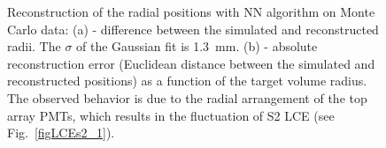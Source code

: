 \begin{figure}[!t]
\centering
{}
\caption[Reconstruction of the radial positions with the neural network algorithm on Monte Carlo data]{Reconstruction of the radial positions with NN algorithm on Monte Carlo data: (a) - difference between the simulated and reconstructed radii. The $\sigma$ of the Gaussian fit is 1.3~mm. (b) - absolute reconstruction error (Euclidean distance between the simulated and reconstructed positions) as a function of the target volume radius. The observed behavior is due to the radial arrangement of the top array PMTs, which results in the fluctuation of S2 LCE (see Fig.~\ref{figLCEs2_1}).}
\label{figNNmcRadii}
\end{figure}


